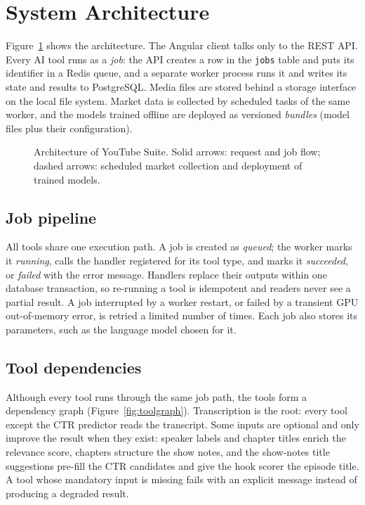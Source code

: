 \section{System Architecture}

Figure~\ref{fig:architecture} shows the architecture. The Angular client talks only to the REST API. Every AI tool runs as a \textit{job}: the API creates a row in the \texttt{jobs} table and puts its identifier in a Redis queue, and a separate worker process runs it and writes its state and results to PostgreSQL. Media files are stored behind a storage interface on the local file system. Market data is collected by scheduled tasks of the same worker, and the models trained offline are deployed as versioned \textit{bundles} (model files plus their configuration).

\begin{figure}[H]
\centering
{}
\caption{Architecture of YouTube Suite. Solid arrows: request and job flow; dashed arrows: scheduled market collection and deployment of trained models.}
\label{fig:architecture}
\end{figure}

\subsection*{Job pipeline}

All tools share one execution path. A job is created as \textit{queued}; the worker marks it \textit{running}, calls the handler registered for its tool type, and marks it \textit{succeeded}, or \textit{failed} with the error message. Handlers replace their outputs within one database transaction, so re-running a tool is idempotent and readers never see a partial result. A job interrupted by a worker restart, or failed by a transient GPU out-of-memory error, is retried a limited number of times. Each job also stores its parameters, such as the language model chosen for it.

\subsection*{Tool dependencies}

Although every tool runs through the same job path, the tools form a dependency graph (Figure~\ref{fig:toolgraph}). Transcription is the root: every tool except the CTR predictor reads the transcript. Some inputs are optional and only improve the result when they exist: speaker labels and chapter titles enrich the relevance score, chapters structure the show notes, and the show-notes title suggestions pre-fill the CTR candidates and give the hook scorer the episode title. A tool whose mandatory input is missing fails with an explicit message instead of producing a degraded result.

